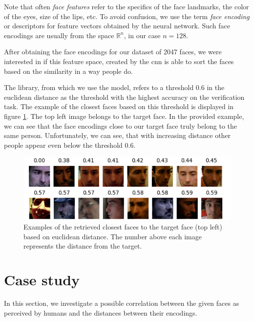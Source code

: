Note that often \emph{face features} refer to the specifics of the face landmarks, the color of the eyes, size of the lips, etc. To avoid confusion, we use the term \emph{face encoding} or descriptors for feature vectors obtained by the neural network. Such face encodings are usually from the space $\mathbb{R}^n$, in our case $n=128$.

After obtaining the face encodings for our dataset of 2047 faces, we were interested in if this feature space, created by the \acrshort{cnn} is able to sort the faces based on the similarity in a way people do. 

The library, from which we use the model, refers to a threshold 0.6 in the euclidean distance as the threshold with the highest accuracy on the verification task. The example of the closest faces based on this threshold is displayed in figure \ref{fig:closest_faces}. The top left image belongs to the target face. In the provided example, we can see that the face encodings close to our target face truly belong to the same person. Unfortunately, we can see, that with increasing distance other people appear even below the threshold 0.6.


\begin{figure}
    \centering
    \includegraphics[width=\linewidth]{img/man_closest_faces.pdf}
    \caption{Examples of the retrieved closest faces to the target face (top left) based on euclidean distance. The number above each image represents the distance from the target.}
    \label{fig:closest_faces}
\end{figure}

\section{Case study}
\label{s:case_study}


In this section, we investigate a possible correlation between the given faces as perceived by humans and the distances between their encodings.

